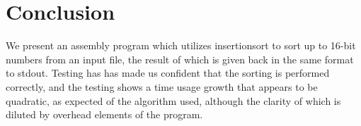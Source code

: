 \section{Conclusion}
We present an assembly program which utilizes insertionsort to sort up to 16-bit numbers from an input file, the result of which is given back in the same format to stdout.
Testing has has made us confident that the sorting is performed correctly, and the testing shows a time usage growth that appears to be quadratic, as expected of the algorithm used, although the clarity of which is diluted by overhead elements of the program.

